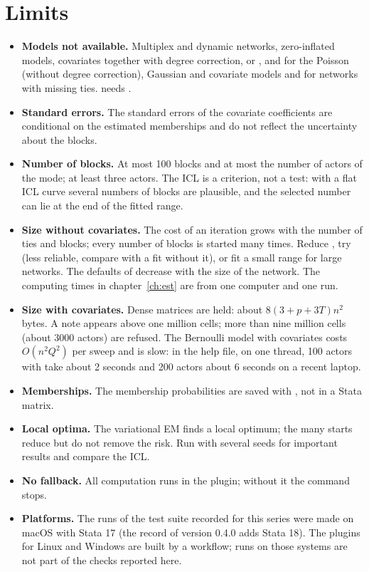 \chapter{Limits}\label{ch:limits}

\begin{itemize}
\item \textbf{Models not available.} Multiplex and dynamic networks, zero-inflated models, covariates together with degree correction,  or , and  for the Poisson (without degree correction), Gaussian and covariate models and for networks with missing ties.  needs .
\item \textbf{Standard errors.} The standard errors of the covariate coefficients are conditional on the estimated memberships and do not reflect the uncertainty about the blocks.
\item \textbf{Number of blocks.} At most 100 blocks and at most the number of actors of the mode; at least three actors. The ICL is a criterion, not a test: with a flat ICL curve several numbers of blocks are plausible, and the selected number can lie at the end of the fitted range.
\item \textbf{Size without covariates.} The cost of an iteration grows with the number of ties and blocks; every number of blocks is started many times. Reduce , try  (less reliable, compare with a fit without it), or fit a small range for large networks. The defaults of  decrease with the size of the network. The computing times in chapter~\ref{ch:est} are from one computer and one run.
\item \textbf{Size with covariates.} Dense matrices are held: about $8(3+p+3T)n^2$ bytes. A note appears above one million cells; more than nine million cells (about 3000 actors) are refused. The Bernoulli model with covariates costs $O(n^2Q^2)$ per sweep and is slow: in the help file, on one thread, 100 actors with  take about 2 seconds and 200 actors about 6 seconds on a recent laptop.
\item \textbf{Memberships.} The membership probabilities are saved with , not in a Stata matrix.
\item \textbf{Local optima.} The variational EM finds a local optimum; the many starts reduce but do not remove the risk. Run with several seeds for important results and compare the ICL.
\item \textbf{No fallback.} All computation runs in the plugin; without it the command stops.
\item \textbf{Platforms.} The runs of the test suite recorded for this series were made on macOS with Stata 17 (the record of version 0.4.0 adds Stata 18). The plugins for Linux and Windows are built by a workflow; runs on those systems are not part of the checks reported here.
\end{itemize}
